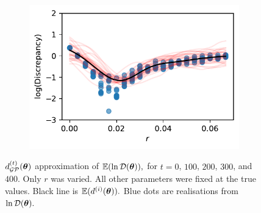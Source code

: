 \begin{figure}[htbp]
\begin{subfigure}[b]{0.5\textwidth}
        \includegraphics[width=\textwidth]{
            ../champagne_GP_images/r_slice_400_bolfi_updates_log_discrep.pdf
        }
    \end{subfigure}
    \caption{
        $d_{\mathcal{GP}}^{(t)}(\bm{\theta})$ approximation of $\operatorname{\mathbb{E}}(\ln\mathcal{D}(\bm{\theta})),$ 
        for $t= 0$, $100$, $200$, $300$, and $400.$ Only $r$ was 
        varied. All other parameters were fixed at the true values. Black line 
        is
        $\operatorname{\mathbb{E}}(d^{(i)}(\bm{\theta})).$
        Blue dots are realisations from $\ln\mathcal{D}(\bm{\theta}).$
    }
\end{figure}